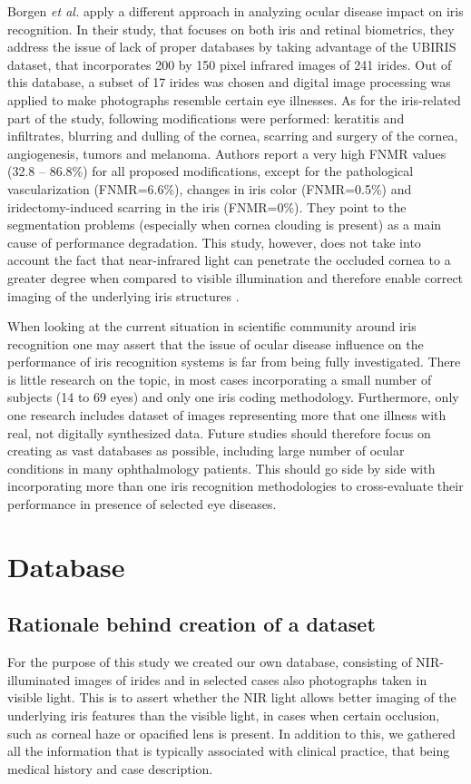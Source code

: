\documentclass[a4paper]{spie}
\begin{document}
Borgen \emph{et al.} \cite{Borgen} apply a different approach in analyzing ocular disease impact on iris recognition. In their study, that focuses on both iris and retinal biometrics, they address the issue of lack of proper databases by taking advantage of the UBIRIS dataset, that incorporates 200 by 150 pixel infrared images of 241 irides. Out of this database, a subset of 17 irides was chosen and digital image processing was applied to make photographs resemble certain eye illnesses. As for the iris-related part of the study, following modifications were performed: keratitis and infiltrates, blurring and dulling of the cornea, scarring and surgery of the cornea, angiogenesis, tumors and melanoma. Authors report a very high FNMR values (32.8 -- 86.8\%) for all proposed modifications, except for the pathological vascularization (FNMR=6.6\%), changes in iris color (FNMR=0.5\%) and iridectomy-induced scarring in the iris (FNMR=0\%). They point to the segmentation problems (especially when cornea clouding is present) as a main cause of performance degradation. This study, however, does not take into account the fact that near-infrared light can penetrate the occluded cornea to a greater degree when compared to visible illumination and therefore enable correct imaging of the underlying iris structures \cite{Aslam}.

When looking at the current situation in scientific community around iris recognition one may assert that the issue of ocular disease influence on the performance of iris recognition systems is far from being fully investigated. There is little research on the topic, in most cases incorporating a small number of subjects (14 to 69 eyes) and only one iris coding methodology. Furthermore, only one research includes dataset of images representing more that one illness with real, not digitally synthesized data. Future studies should therefore focus on creating as vast databases as possible, including large number of ocular conditions in many ophthalmology patients. This should go side by side with incorporating more than one iris recognition methodologies to cross-evaluate their performance in presence of selected eye diseases.

\section{Database}

\subsection{Rationale behind creation of a dataset}
For the purpose of this study we created our own database, consisting of NIR-illuminated images of irides and in selected cases also photographs taken in visible light. This is to assert whether the NIR light allows better imaging of the underlying iris features than the visible light, in cases when certain occlusion, such as corneal haze or opacified lens is present. In addition to this, we gathered all the information that is typically associated with clinical practice, that being medical history and case description.
\end{document}
